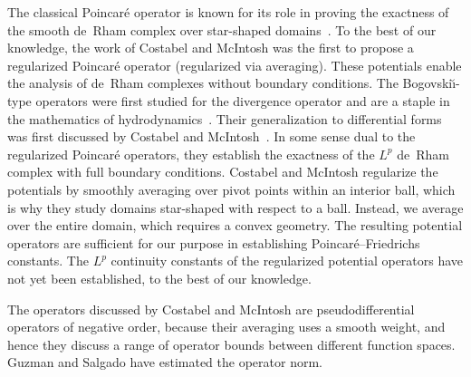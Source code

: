 \documentclass[10pt,letterpaper]{article}
\begin{document}


\begin{remark}
    The classical Poincar\'e operator is known for its role in proving the exactness of the smooth de~Rham complex over star-shaped domains~\cite{lee2012smooth}.
    To the best of our knowledge, the work of Costabel and McIntosh was the first to propose a regularized Poincar\'e operator (regularized via averaging).
    These potentials enable the analysis of de~Rham complexes without boundary conditions.
    The Bogovski\u{\i}-type operators were first studied for the divergence operator and are a staple in the mathematics of hydrodynamics~\cite{bogovskii1979solution}.
    Their generalization to differential forms was first discussed by Costabel and McIntosh~\cite{costabel2010bogovskiui}. 
    In some sense dual to the regularized Poincar\'e operators, they establish the exactness of the $L^{p}$ de~Rham complex with full boundary conditions.
    Costabel and McIntosh regularize the potentials by smoothly averaging over pivot points within an interior ball, 
    which is why they study domains star-shaped with respect to a ball. 
    Instead, we average over the entire domain, which requires a convex geometry. 
    The resulting potential operators are sufficient for our purpose in establishing Poincar\'e--Friedrichs constants. 
    The $L^{p}$ continuity constants of the regularized potential operators have not yet been established, to the best of our knowledge.
    
    The operators discussed by Costabel and McIntosh are pseudodifferential operators of negative order, 
    because their averaging uses a smooth weight, 
    and hence they discuss a range of operator bounds between different function spaces. 
    Guzman and Salgado have estimated the operator norm. 
\end{remark}
\end{document}
